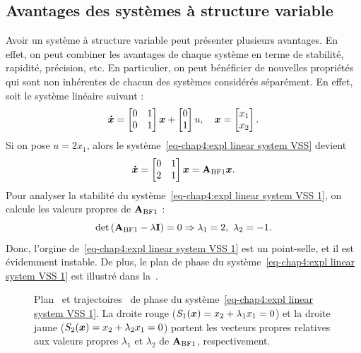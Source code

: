 \subsection{Avantages des systèmes à structure variable}
Avoir un système à structure variable peut présenter plusieurs avantages. En effet, on peut combiner les avantages de chaque système en terme de stabilité, rapidité, précision, etc. En particulier, on peut bénéficier de nouvelles propriétés qui sont non inhérentes de chacun des systèmes considérés séparément. En effet, soit le système linéaire suivant :
\begin{equation}\label{eq-chap4:expl linear system VSS}
	\bm{\dot{x}} = \begin{bmatrix}
		0&1\\0&1
	\end{bmatrix}\bm{x} + \begin{bmatrix}
	0\\1
	\end{bmatrix}u, \quad \bm{x} = \begin{bmatrix}
	x_1 \\ x_2
	\end{bmatrix}.
\end{equation}
Si on pose $u = 2x_1$, alors le système~\eqref{eq-chap4:expl linear system VSS} devient
\begin{equation}\label{eq-chap4:expl linear system VSS 1}
	\bm{\dot{x}} = \begin{bmatrix}
		0&1\\2&1
	\end{bmatrix}\bm{x} = \mathbf{A}_{\rm BF 1}\bm{x}.
\end{equation}
Pour analyser la stabilité du système~\eqref{eq-chap4:expl linear system VSS 1}, on calcule les valeurs propres de $\mathbf{A}_{\rm BF 1}$ :
\begin{equation}\label{eq-chap4:eigen vaues sys1}
	\det\left(\mathbf{A}_{\rm BF 1}-\lambda\mathbf{I}\right) = 0 \Rightarrow \lambda_1 = 2, \  \lambda_2 = -1.
\end{equation}
Donc, l'orgine de~\eqref{eq-chap4:expl linear system VSS 1} est un point-selle, et il est évidemment instable. De plus, le plan de phase du système~\eqref{eq-chap4:expl linear system VSS 1} est illustré dans la~.
\begin{figure}
	\centering
	\caption{Plan~ et trajectoires~ de phase du système~\eqref{eq-chap4:expl linear system VSS 1}. La droite rouge ($S_1(\bm{x})=x_2 + \lambda_1x_1=0$) et la droite   jaune ($S_2(\bm{x}) = x_2 + \lambda_2x_1=0$)   portent les vecteurs propres relatives aux valeurs propres $\lambda_1$ et $\lambda_2$ de $\mathbf{A}_{\rm BF 1}$, respectivement.}
	\label{fig:sys1}
\end{figure}


